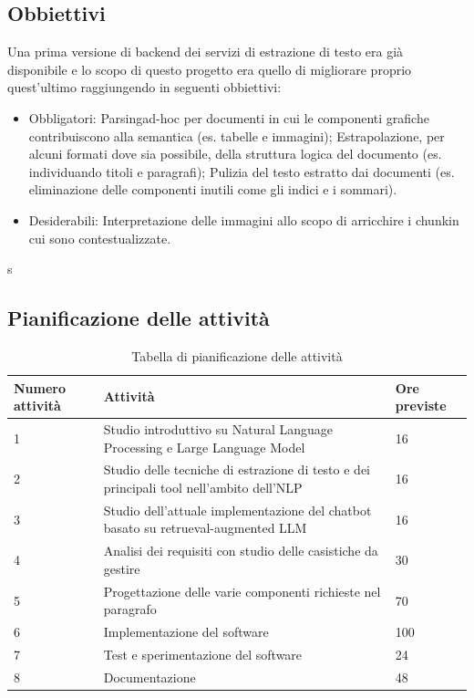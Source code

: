 \subsection{Obbiettivi}
Una prima versione di backend dei servizi di estrazione di testo era già disponibile e lo scopo di questo progetto era quello di migliorare proprio quest'ultimo raggiungendo in seguenti obbiettivi:

\begin{itemize}
    \item Obbligatori:
    \subitem \gls{Parsing}\glsfirstoccur ad-hoc per documenti in cui le componenti grafiche contribuiscono alla semantica (es. tabelle e immagini);
    \subitem Estrapolazione, per alcuni formati dove sia possibile, della struttura logica del documento (es. individuando titoli e paragrafi);
    \subitem Pulizia del testo estratto dai documenti (es. eliminazione delle componenti inutili come gli indici e i sommari).
    \item Desiderabili:
    \subitem Interpretazione delle immagini allo scopo di arricchire i \gls{chunk}\glsfirstoccur in cui sono contestualizzate. 
\end{itemize}

s\subsection{Pianificazione delle attività}
\begin{table}[H]
    \centering
    \begin{tabular}{p{2cm} p{8cm} p{2cm}}
        \hline
        Numero attività & Attività & Ore previste \\
        \hline
        1 & Studio introduttivo su Natural Language Processing e Large Language Model & 16 \\
        \hline
        2 & Studio delle tecniche di estrazione di testo e dei principali tool nell'ambito dell'NLP & 16 \\
        \hline
        3 & Studio dell'attuale implementazione del chatbot basato su retrueval-augmented LLM & 16 \\
        \hline
        4 & Analisi dei requisiti con studio delle casistiche da gestire & 30 \\
        \hline
        5 & Progettazione delle varie componenti richieste nel paragrafo  & 70 \\
        \hline
        6 & Implementazione del software & 100 \\
        \hline
        7 & Test e sperimentazione del software & 24 \\
        \hline
        8 & Documentazione & 48 \\
        \hline
    \end{tabular}
    \caption{Tabella di pianificazione delle attività}
\end{table}

